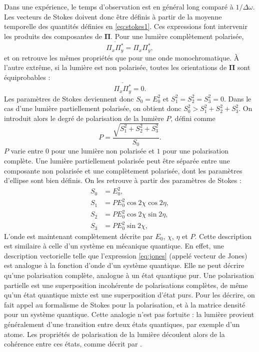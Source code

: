 Dans une expérience, le temps d'observation est en général long comparé à $1/\Delta\omega$. Les vecteurs de Stokes doivent donc être définis à partir de la moyenne temporelle des quantités définies en \ref{eq:stokes1}. Ces expressions font intervenir les produits des composantes de $\bm{\Pi}$. Pour une lumière complètement polarisée,
\[\overline{\Pi_x \Pi^*_y} = \Pi_x \Pi^*_y,\]
et on retrouve les mêmes propriétés que pour une onde monochromatique. \`{A} l'autre extrême, si la lumière est non polarisée, toutes les orientations de $\bm{\Pi}$ sont équiprobables :
\[\overline{\Pi_x \Pi^*_y} = 0.\]
Les paramètres de Stokes deviennent donc $S_0 = E_0^2$ et $S_1^2 = S_2^2 = S_3^2 = 0$. Dans le cas d'une lumière partiellement polarisée, on obtient donc $S_0^2 > S_1^2+S_2^2+S_3^2$. On introduit alors le degré de polarisation de la lumière $P$, défini comme 
\[P = \frac{\sqrt{S_1^2+S_2^2+S_3^2}}{S_0}.\] $P$ varie entre $0$ pour une lumière non polarisée et $1$ pour une polarisation complète. Une lumière partiellement polarisée peut être séparée entre une composante non polarisée et une complètement polarisée, dont les paramètres d'ellipse sont bien définis. On les retrouve à partir des paramètres de Stokes :
\begin{align}
S_0 &= E_0^2,\nonumber\\
S_1 &= PE_0^2\cos 2\chi\cos 2\eta ,\nonumber\\
S_2 &= PE_0^2\cos 2\chi\sin 2\eta,\nonumber\\
S_3 &= PE_0^2\sin 2\chi,	
\label{eq:stokes2}
\end{align}
L'onde est maintenant complètement décrite par $E_0$, $\chi$, $\eta$ et $P$. Cette description est similaire à celle d'un système en mécanique quantique. En effet, une description vectorielle telle que l'expression \ref{eq:jones} (appelé vecteur de Jones) est analogue à la fonction d'onde d'un système quantique. Elle ne peut décrire qu'une polarisation complète, analogue à un état quantique pur. Une polarisation partielle est une superposition incohérente de polarisations complètes, de même qu'un état quantique mixte est une superposition d'état purs. Pour les décrire, on fait appel au formalisme de Stokes pour la polarisation, et à la matrice densité pour un système quantique. Cette analogie n'est pas fortuite : la lumière provient généralement d'une transition entre deux états quantiques, par exemple d'un atome. Les propriétés de polarisation de la lumière découlent alors de la cohérence entre ces états, comme décrit par . 

